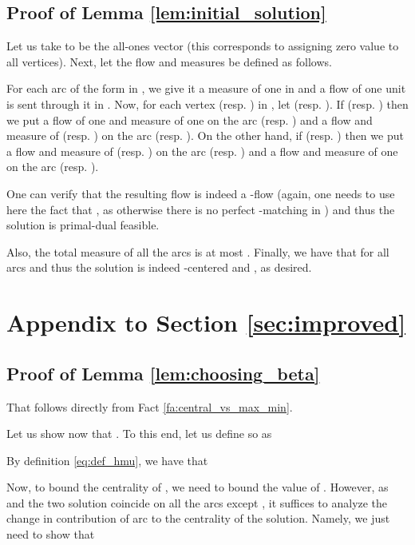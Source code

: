 \documentclass[11pt, letterpaper]{article}
\begin{document}
\subsection{Proof of Lemma \ref{lem:initial_solution}}\label{app:initial_solution}


Let us take  to be the all-ones vector  (this corresponds to  assigning zero value to all vertices). Next, let the flow  and measures  be defined as follows. 

For each arc of the form  in , we give it a measure of one in  and a flow of one unit is sent through it in . Now, for each vertex  (resp. ) in , let  (resp. ). If  (resp. ) then we put a flow of one and measure of one on the arc  (resp. ) and a flow and measure of  (resp. )  on the arc  (resp. ). On the other hand, if  (resp. ) then we put a flow and measure of  (resp. ) on the arc  (resp. ) and a flow and measure of one on the arc  (resp. ).

One can verify that the resulting flow  is indeed a -flow (again, one needs to use here the fact that , as otherwise there is no perfect -matching in ) and thus the solution is primal-dual feasible. 

Also, the total measure  of all the arcs is at most . Finally, we have that  for all arcs  and thus the solution is indeed -centered and , as desired.

 \section{Appendix to Section \ref{sec:improved}}\label{app:improved_algorithm}




\subsection{Proof of Lemma \ref{lem:choosing_beta}}\label{app:choosing_beta}


That  follows directly from Fact \ref{fa:central_vs_max_min}.

Let us show now that . To this end, let us define  so as 


By definition \eqref{eq:def_hmu}, we have that


Now, to bound the centrality of , we need to bound the value of . However, as  and the two solution coincide on all the arcs except , it suffices to analyze the change in contribution of arc  to the centrality of the solution. Namely, we just need to show that 
\end{document}
